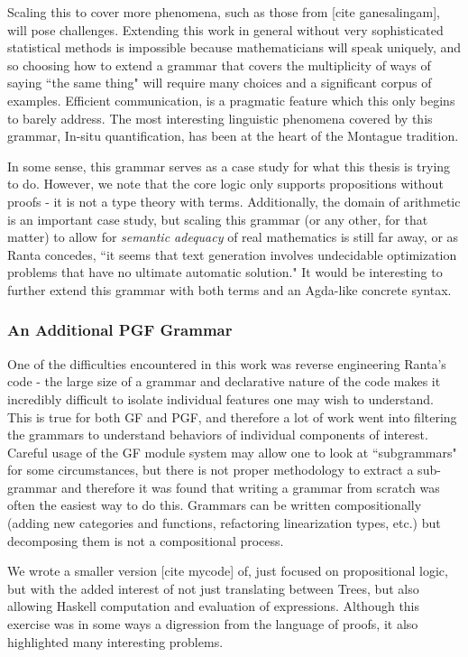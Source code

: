 Scaling this to cover more phenomena, such as those from [cite ganesalingam], will
pose challenges. Extending this work in general without very sophisticated
statistical methods is impossible because mathematicians will speak uniquely,
and so choosing how to extend a grammar that covers the multiplicity of ways of saying
``the same thing" will require many choices and a significant corpus of examples. Efficient
communication, is a pragmatic feature which this only begins to barely address. The most
interesting linguistic phenomena covered by this grammar, In-situ
quantification, has been at the heart of the Montague tradition.

In some sense, this grammar serves as a case study for what this thesis is
trying to do. However, we note that the core logic only supports propositions
without proofs - it is not a type theory with terms. Additionally, the domain of
arithmetic is an important case study, but scaling this grammar (or any other,
for that matter) to allow for \emph{semantic adequacy} of real mathematics is
still far away, or as Ranta concedes, ``it seems that text generation involves
undecidable optimization problems that have no ultimate automatic solution." It
would be interesting to further extend this grammar with both terms and an
Agda-like concrete syntax.

\subsubsection{An Additional PGF Grammar}

One of the difficulties encountered in this work was reverse engineering Ranta's
code - the large size of a grammar and declarative nature of the code makes it
incredibly difficult to isolate individual features one may wish to understand.
This is true for both GF and PGF, and therefore a lot of work went into
filtering the grammars to understand behaviors of individual components of
interest. Careful usage of the GF module system may allow one to look at
``subgrammars" for some circumstances, but there is not proper methodology to
extract a sub-grammar and therefore it was found that writing a grammar from
scratch was often the easiest way to do this. Grammars can be written
compositionally (adding new categories and functions, refactoring linearization
types, etc.) but decomposing them is not a compositional process.

We wrote a smaller version [cite mycode] of, just focused on propositional
logic, but with the added interest of not just translating between Trees, but
also allowing Haskell computation and evaluation of expressions. Although this
exercise was in some ways a digression from the language of proofs, it also
highlighted many interesting problems.

